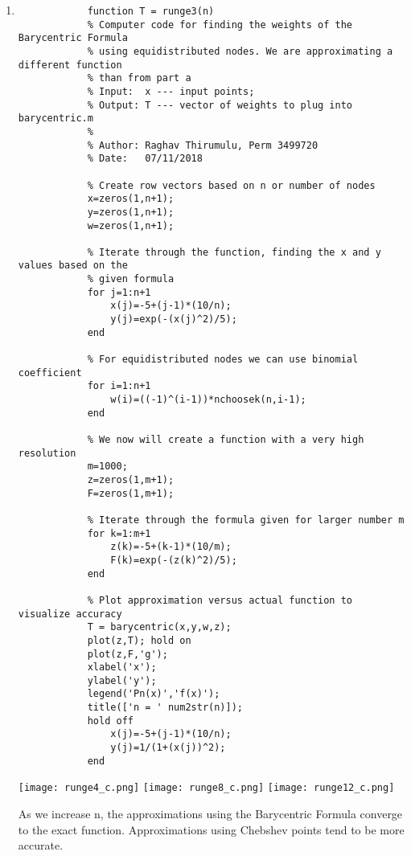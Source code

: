 \documentclass{article}
\begin{document}
\begin{enumerate}
\begin{enumerate}
            \item
            \begin{lstlisting}
            function T = runge3(n)
            % Computer code for finding the weights of the Barycentric Formula
            % using equidistributed nodes. We are approximating a different function
            % than from part a
            % Input:  x --- input points;
            % Output: T --- vector of weights to plug into barycentric.m
            %
            % Author: Raghav Thirumulu, Perm 3499720
            % Date:   07/11/2018

            % Create row vectors based on n or number of nodes
            x=zeros(1,n+1);
            y=zeros(1,n+1);
            w=zeros(1,n+1);

            % Iterate through the function, finding the x and y values based on the
            % given formula
            for j=1:n+1
                x(j)=-5+(j-1)*(10/n);
                y(j)=exp(-(x(j)^2)/5);
            end

            % For equidistributed nodes we can use binomial coefficient
            for i=1:n+1
                w(i)=((-1)^(i-1))*nchoosek(n,i-1);
            end

            % We now will create a function with a very high resolution
            m=1000;
            z=zeros(1,m+1);
            F=zeros(1,m+1);

            % Iterate through the formula given for larger number m
            for k=1:m+1
                z(k)=-5+(k-1)*(10/m);
                F(k)=exp(-(z(k)^2)/5);
            end

            % Plot approximation versus actual function to visualize accuracy
            T = barycentric(x,y,w,z);
            plot(z,T); hold on
            plot(z,F,'g');
            xlabel('x');
            ylabel('y');
            legend('Pn(x)','f(x)');
            title(['n = ' num2str(n)]);
            hold off
                x(j)=-5+(j-1)*(10/n);
                y(j)=1/(1+(x(j))^2);
            end
            \end{lstlisting}
            
            \begin{center}
            \texttt{[image: runge4\_c.png]}
            \texttt{[image: runge8\_c.png]}
            \texttt{[image: runge12\_c.png]}
            \end{center}
            
            As we increase n, the approximations using the Barycentric Formula converge to the exact function. Approximations using Chebshev points tend to be more accurate.
        \end{enumerate}
\end{enumerate}
\end{document}

